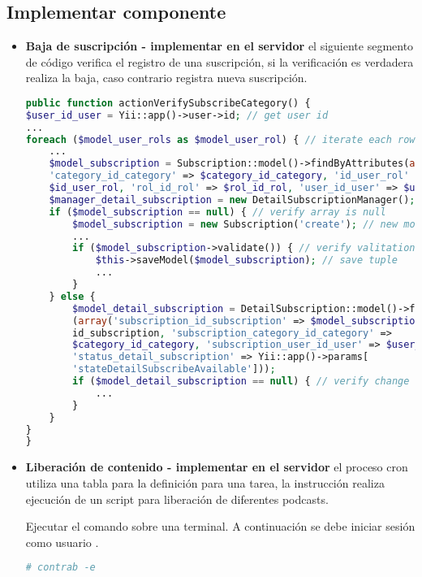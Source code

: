 \subsection{Implementar componente}

\begin{itemize}

\item \textbf{Baja de suscripción - implementar en el servidor} el siguiente
segmento de código verifica el registro de una suscripción, si la verificación
es verdadera realiza la baja, caso contrario registra nueva suscripción.
\begin{lstlisting}[language=PHP, caption={Verificación registro suscripción.}]
public function actionVerifySubscribeCategory() {
$user_id_user = Yii::app()->user->id; // get user id
...
foreach ($model_user_rols as $model_user_rol) { // iterate each row UserRol
    ...
    $model_subscription = Subscription::model()->findByAttributes(array(
    'category_id_category' => $category_id_category, 'id_user_rol' => 
    $id_user_rol, 'rol_id_rol' => $rol_id_rol, 'user_id_user' => $user_id_user));
    $manager_detail_subscription = new DetailSubscriptionManager();
    if ($model_subscription == null) { // verify array is null
        $model_subscription = new Subscription('create'); // new model Interest
        ...
        if ($model_subscription->validate()) { // verify valitation
            $this->saveModel($model_subscription); // save tuple
            ...
        }
    } else {
        $model_detail_subscription = DetailSubscription::model()->findByAttributes
        (array('subscription_id_subscription' => $model_subscription->
        id_subscription, 'subscription_category_id_category' => 
        $category_id_category, 'subscription_user_id_user' => $user_id_user,
        'status_detail_subscription' => Yii::app()->params[
        'stateDetailSubscribeAvailable']));
        if ($model_detail_subscription == null) { // verify change
            ...
        }
    }
}    
}
\end{lstlisting}

\item \textbf{Liberación de contenido - implementar en el servidor} el
proceso cron utiliza una tabla para la definición para una tarea, la
instrucción realiza ejecución de un script para liberación de diferentes
podcasts.

Ejecutar el comando sobre una terminal. A continuación se debe iniciar sesión
como usuario .

\begin{lstlisting}[language=bash, caption={Acceso archivo crontab.}]
# contrab -e
\end{lstlisting}


\end{itemize}
